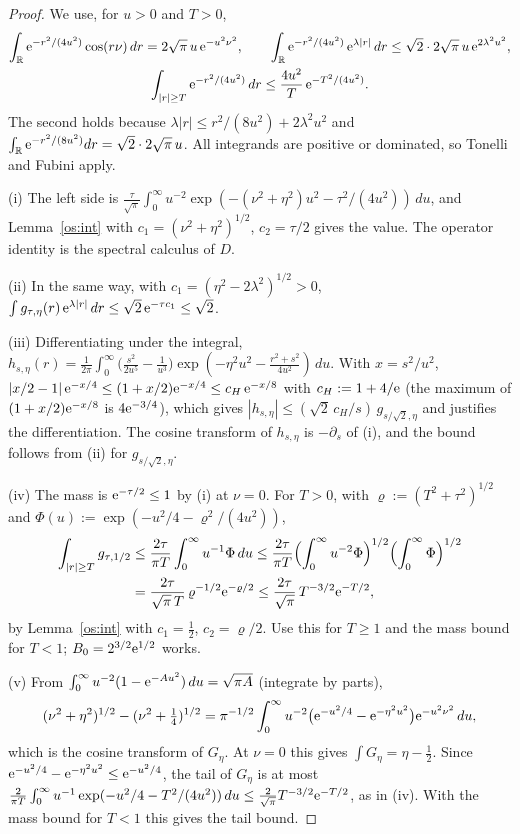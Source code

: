 \begin{proof}
We use, for $u>0$ and $T>0$,
\begin{gather*}
\int_{\mathbb R}\mathrm{e}^{-r^2/(4u^2)}\cos(r\nu)\,dr=2\sqrt\pi\,u\,\mathrm{e}^{-u^2\nu^2},\qquad
\int_{\mathbb R}\mathrm{e}^{-r^2/(4u^2)}\,\mathrm{e}^{\lambda|r|}\,dr\le\sqrt2\cdot2\sqrt\pi\,u\,\mathrm{e}^{2\lambda^2u^2},\\
\int_{|r|\ge T}\mathrm{e}^{-r^2/(4u^2)}\,dr\le\frac{4u^2}{T}\,\mathrm{e}^{-T^2/(4u^2)} .
\end{gather*}
The second holds because $\lambda|r|\le r^2/(8u^2)+2\lambda^2u^2$ and $\int_{\mathbb R}\mathrm{e}^{-r^2/(8u^2)}dr=\sqrt2\cdot2\sqrt\pi\,u$.
All integrands are positive or dominated, so Tonelli and Fubini apply.

(i) The left side is $\frac{\tau}{\sqrt\pi}\int_0^\infty u^{-2}\exp(-(\nu^2+\eta^2)u^2-\tau^2/(4u^2))\,du$, and Lemma~\ref{os:int} with
$c_1=(\nu^2+\eta^2)^{1/2}$, $c_2=\tau/2$ gives the value. The operator identity is the spectral calculus of $D$.

(ii) In the same way, with $c_1=(\eta^2-2\lambda^2)^{1/2}>0$, $\int g_{\tau,\eta}(r)\,\mathrm{e}^{\lambda|r|}\,dr\le\sqrt2\,\mathrm{e}^{-\tau c_1}\le\sqrt2$.

(iii) Differentiating under the integral,
$h_{s,\eta}(r)=\frac1{2\pi}\int_0^\infty\bigl(\frac{s^2}{2u^5}-\frac1{u^3}\bigr)\exp(-\eta^2u^2-\frac{r^2+s^2}{4u^2})\,du$. With $x=s^2/u^2$,
$|x/2-1|\,\mathrm{e}^{-x/4}\le(1+x/2)\mathrm{e}^{-x/4}\le c_H\,\mathrm{e}^{-x/8}$ with $c_H:=1+4/\mathrm{e}$ (the maximum of $(1+x/2)\mathrm{e}^{-x/8}$ is
$4\mathrm{e}^{-3/4}$), which gives $|h_{s,\eta}|\le(\sqrt2\,c_H/s)\,g_{s/\sqrt2,\eta}$ and
justifies the differentiation. The cosine transform of $h_{s,\eta}$ is $-\partial_s$ of (i), and the bound follows from (ii) for $g_{s/\sqrt2,\eta}$.

(iv) The mass is $\mathrm{e}^{-\tau/2}\le1$ by (i) at $\nu=0$. For $T>0$, with $\varrho:=(T^2+\tau^2)^{1/2}$ and
$\Phi(u):=\exp(-u^2/4-\varrho^2/(4u^2))$,
\begin{align*}
\int_{|r|\ge T}g_{\tau,1/2}&\le\frac{2\tau}{\pi T}\int_0^\infty u^{-1}\Phi\,du\le\frac{2\tau}{\pi T}\Bigl(\int_0^\infty u^{-2}\Phi\Bigr)^{1/2}\Bigl(\int_0^\infty\Phi\Bigr)^{1/2}\\
&=\frac{2\tau}{\sqrt\pi\,T}\,\varrho^{-1/2}\mathrm{e}^{-\varrho/2}\le\frac{2\tau}{\sqrt\pi}\,T^{-3/2}\mathrm{e}^{-T/2},
\end{align*}
by Lemma~\ref{os:int} with $c_1=\tfrac12$, $c_2=\varrho/2$. Use this for $T\ge1$ and the mass bound for $T<1$; $B_0=2^{3/2}\mathrm{e}^{1/2}$ works.

(v) From $\int_0^\infty u^{-2}(1-\mathrm{e}^{-Au^2})\,du=\sqrt{\pi A}$ (integrate by parts),
\[
(\nu^2+\eta^2)^{1/2}-(\nu^2+\tfrac14)^{1/2}=\pi^{-1/2}\int_0^\infty u^{-2}\bigl(\mathrm{e}^{-u^2/4}-\mathrm{e}^{-\eta^2u^2}\bigr)\mathrm{e}^{-u^2\nu^2}\,du,
\]
which is the cosine transform of $G_\eta$. At $\nu=0$ this gives $\int G_\eta=\eta-\tfrac12$. Since $\mathrm{e}^{-u^2/4}-\mathrm{e}^{-\eta^2u^2}\le\mathrm{e}^{-u^2/4}$, the tail of
$G_\eta$ is at most $\frac{2}{\pi T}\int_0^\infty u^{-1}\exp(-u^2/4-T^2/(4u^2))\,du\le\frac2{\sqrt\pi}T^{-3/2}\mathrm{e}^{-T/2}$, as in (iv). With the mass
bound for $T<1$ this gives the tail bound.
\end{proof}

